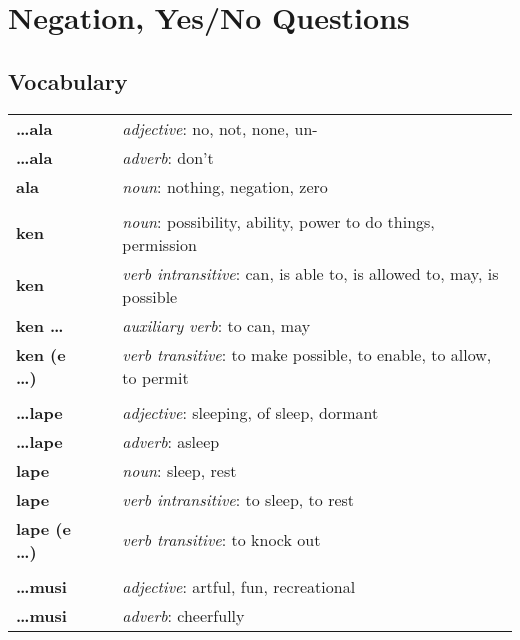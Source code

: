 \section{Negation, Yes/No Questions}
\subsection*{Vocabulary}
%
\begin{supertabular}{p{2,5cm}|ll}
%
\textbf{\dots ala} && \textit{adjective}: no, not, none, un- \\ %
\textbf{\dots ala} && \textit{adverb}: don't \\ %
\textbf{ala} && \textit{noun}: nothing, negation, zero \\ %
 && \\ %
%
\textbf{ken} && \textit{noun}: possibility, ability, power to do things, permission \\ %
\textbf{ken} && \textit{verb intransitive}: can, is able to, is allowed to, may, is possible \\ %
\textbf{ken \dots} && \textit{auxiliary verb}: to can, may \\ %
\textbf{ken (e \dots)} && \textit{verb transitive}: to make possible, to enable, to allow, to permit \\ %
 && \\ %
%
\textbf{\dots lape} && \textit{adjective}: sleeping, of sleep, dormant \\ %
\textbf{\dots lape} && \textit{adverb}: asleep \\ %
\textbf{lape} && \textit{noun}: sleep, rest \\ %
\textbf{lape} && \textit{verb intransitive}: to sleep, to rest \\ %
\textbf{lape (e \dots)} && \textit{verb transitive}: to knock out \\ %
 && \\ %
%
\textbf{\dots musi} && \textit{adjective}: artful, fun, recreational \\ %
\textbf{\dots musi} && \textit{adverb}: cheerfully \\ %

\end{supertabular}
